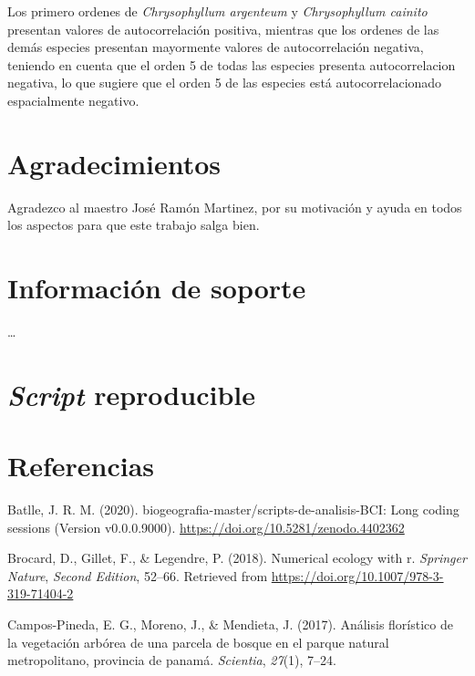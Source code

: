 \documentclass[11pt,]{article}
\begin{document}
Los primero ordenes de \emph{Chrysophyllum argenteum} y
\emph{Chrysophyllum cainito} presentan valores de autocorrelación
positiva, mientras que los ordenes de las demás especies presentan
mayormente valores de autocorrelación negativa, teniendo en cuenta que
el orden 5 de todas las especies presenta autocorrelacion negativa, lo
que sugiere que el orden 5 de las especies está autocorrelacionado
espacialmente negativo.

\section{Agradecimientos}\label{agradecimientos}

Agradezco al maestro José Ramón Martinez, por su motivación y ayuda en
todos los aspectos para que este trabajo salga bien.

\section{Información de soporte}\label{informaciuxf3n-de-soporte}

\ldots

\section{\texorpdfstring{\emph{Script}
reproducible}{Script reproducible}}\label{script-reproducible}

\section*{Referencias}\label{referencias}

\hypertarget{refs}{}
\hypertarget{ref-jose_ramon_martinez_batlle_2020_4402362}{}
Batlle, J. R. M. (2020). biogeografia-master/scripts-de-analisis-BCI:
Long coding sessions (Version v0.0.0.9000).
\url{https://doi.org/10.5281/zenodo.4402362}

\hypertarget{ref-brocard2011numerical}{}
Brocard, D., Gillet, F., \& Legendre, P. (2018). Numerical ecology with
r. \emph{Springer Nature}, \emph{Second Edition}, 52--66. Retrieved from
\url{https://doi.org/10.1007/978-3-319-71404-2}

\hypertarget{ref-campos2017analisis}{}
Campos-Pineda, E. G., Moreno, J., \& Mendieta, J. (2017). Análisis
florístico de la vegetación arbórea de una parcela de bosque en el
parque natural metropolitano, provincia de panamá. \emph{Scientia},
\emph{27}(1), 7--24.
\end{document}
